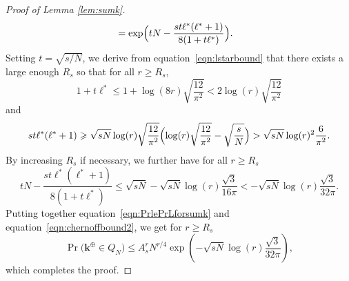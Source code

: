 \documentclass[10pt,a4paper]{amsart}
\newcommand{\bsk}{\boldsymbol{k}}
\renewcommand{\geq}{\geqslant}
\renewcommand{\leq}{\leqslant}
\begin{document}
\begin{proof}[Proof of Lemma \ref{lem:sumk}]
\begin{align}
    &= \exp\Bigl(tN-\frac{st\ell^*(\ell^*+1)}{8(1+t\ell^*)}\Bigr).\nonumber
    \end{align}
    Setting $t=\sqrt{s/N}$, we derive from equation~\eqref{eqn:lstarbound} that there exists a large enough $R_s$ so that for all $r\geq R_s$,
    $$1+t\ell^*\leq 1+\log(8r)\sqrt{\frac{12}{\pi^2 }}<2\log(r)\sqrt{\frac{12}{\pi^2 }}$$
    and
    $$st\ell^*(\ell^*+1)\geq  \sqrt{sN}\log(r)\sqrt{\frac{12}{\pi^2 }}\Bigl(\log(r)\sqrt{\frac{12}{\pi^2 }}-\sqrt{\frac{s}{N}}\Bigr)> \sqrt{sN}\log(r)^2\frac{6}{\pi^2}.$$
    By increasing $R_s$ if necessary, we further have for all $r\geq R_s$
    $$tN-\frac{st\ell^*(\ell^*+1)}{8(1+t\ell^*)}\leq \sqrt{sN}-\sqrt{sN}\log(r)\frac{\sqrt{3}}{16\pi}<-\sqrt{sN}\log(r)\frac{\sqrt{3}}{32\pi}.$$
    Putting together equation~\eqref{eqn:PrlePrLforsumk} and equation~\eqref{eqn:chernoffbound2}, we get for $r\geq R_s$
    $$\Pr\big(\bsk^\oplus\in Q_N\big)\leq A^r_sN^{r/4}\exp(-\sqrt{sN}\log(r)\frac{\sqrt{3}}{32\pi}),$$
    which completes the proof.
\end{proof}
\end{document}
